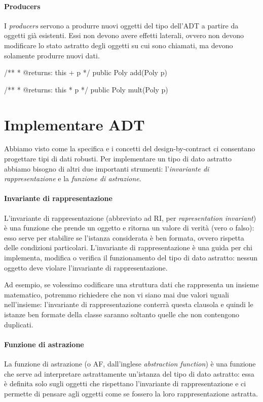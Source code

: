 \paragraph{Producers}
I \emph{producers} servono a produrre nuovi oggetti del tipo dell'ADT a partire da oggetti già esistenti. Essi non devono avere effetti laterali, ovvero non devono modificare lo stato astratto degli oggetti su cui sono chiamati, ma devono solamente produrre nuovi dati.
\begin{Java}
    /**
     * @returns: this + p
     */
    public Poly add(Poly p) { }

    /**
     * @returns: this * p
     */
    public Poly mult(Poly p) { }
\end{Java}


\section{Implementare ADT}

Abbiamo visto come la specifica e i concetti del design-by-contract ci consentano progettare tipi di dati robusti. Per implementare un tipo di dato astratto abbiamo bisogno di altri due importanti strumenti: l'\emph{invariante di rappresentazione} e la \emph{funzione di astrazione}.

\paragraph{Invariante di rappresentazione} L'invariante di rappresentazione (abbreviato ad RI, per \emph{rapresentation invariant}) è una funzione che prende un oggetto e ritorna un valore di verità (vero o falso): esso serve per stabilire se l'istanza considerata è ben formata, ovvero rispetta delle condizioni particolari. 
L'invariante di rappresentazione è una guida per chi implementa, modifica o verifica il funzionamento del tipo di dato astratto: nessun oggetto deve violare l'invariante di rappresentazione.

Ad esempio, se volessimo codificare una struttura dati che rappresenta un insieme matematico, potremmo richiedere che non vi siano mai due valori uguali nell'insieme: l'invariante di rappresentazione conterrà questa clausola e quindi le istanze ben formate della classe saranno soltanto quelle che non contengono duplicati.

\paragraph{Funzione di astrazione} La funzione di astrazione (o AF, dall'inglese \emph{abstraction function}) è una funzione che serve ad interpretare astrattamente un'istanza del tipo di dato astratto: essa è definita solo sugli oggetti che rispettano l'invariante di rappresentazione e ci permette di pensare agli oggetti come se fossero la loro rappresentazione astratta.

